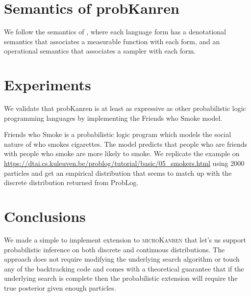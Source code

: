 \documentclass[
]{ceurart}
\begin{document}
\section{Semantics of probKanren}

We follow the semantics of \cite{staton2016semantics}, where each
language form has a denotational semantics that associates a
measurable function with each form, and an operational semantics that associates
a sampler with each form.

\section{Experiments}

We validate that probKanren is at least as expressive as other probabilistic
logic programming languages by implementing the Friends who Smoke model.

Friends who Smoke is a probabilistic logic program which models the
social nature of who smokes cigarettes. The model predicts that people
who are friends with people who smoke are more likely to smoke. We
replicate the example on
\url{https://dtai.cs.kuleuven.be/problog/tutorial/basic/05_smokers.html}
using 2000 particles and get an empirical distribution that seems to
match up with the discrete distribution returned from ProbLog.




\section{Conclusions}

We made a simple to implement extension to \textsc{microKanren} that
let's us support probabilistic inference on both discrete and
continuous distributions. The approach does not require modifying the
underlying search algorithm or touch any of the backtracking code and
comes with a theoretical guarantee that if the underlying search is
complete then the probabilistic extension will require the true
posterior given enough particles.
\end{document}
